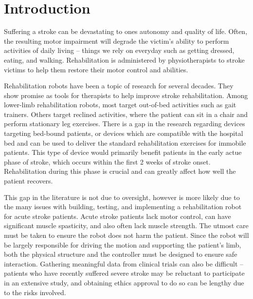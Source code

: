\documentclass[12pt]{report}
\begin{document}
\chapter{Introduction}

Suffering a stroke can be devastating to ones autonomy and quality of life. Often, the resulting motor impairment will degrade the victim's ability to perform activities of daily living -- things we rely on everyday such as getting dressed, eating, and walking. Rehabilitation is administered by physiotherapists to stroke victims to help them restore their motor control and abilities. 

Rehabilitation robots have been a topic of research for several decades. They show promise as tools for therapists to help improve stroke rehabilitation. Among lower-limb rehabilitation robots, most target out-of-bed activities such as gait trainers. Others target reclined activities, where the patient can sit in a chair and perform stationary leg exercises. There is a gap in the research regarding devices targeting bed-bound patients, or devices which are compatible with the hospital bed and can be used to deliver the standard rehabilitation exercises for immobile patients. This type of device would primarily benefit patients in the early actue phase of stroke, which occurs within the first 2 weeks of stroke onset. Rehabilitation during this phase is crucial and can greatly affect how well the patient recovers. 

This gap in the literature is not due to oversight, however is more likely due to the many issues with building, testing, and implementing a rehabilitation robot for acute stroke patients. Acute stroke patients lack motor control, can have significant muscle spasticity, and also often lack muscle strength. The utmost care must be taken to ensure the robot does not harm the patient. Since the robot will be largely responsible for driving the motion and supporting the patient's limb, both the physical structure and the controller must be designed to ensure safe interaction. Gathering meaningful data from clinical trials can also be difficult -- patients who have recently suffered severe stroke may be reluctant to participate in an extensive study, and obtaining ethics approval to do so can be lengthy due to the risks involved. 
\end{document}
